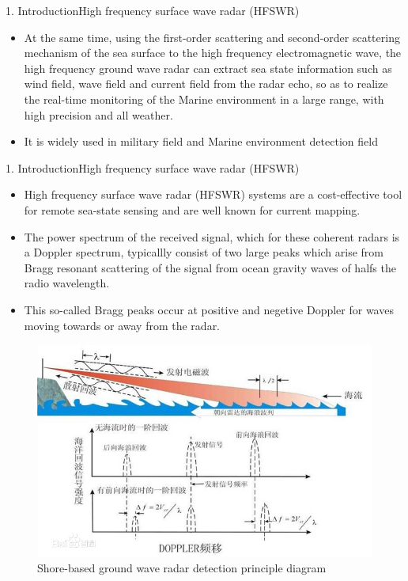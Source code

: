 \documentclass[12pt]{beamer}
\begin{document}
\begin{frame}{1. Introduction}{High frequency surface wave radar (HFSWR)}
  \begin{itemize}
    \item At the same time, using the first-order scattering and second-order scattering mechanism of the sea surface to the high frequency electromagnetic wave, the high frequency ground wave radar can extract sea state information such as wind field, wave field and current field from the radar echo, so as to realize the real-time monitoring of the Marine environment in a large range, with high precision and all weather.
    \item It is widely used in military field and Marine environment detection field
  \end{itemize}
\end{frame}


\begin{frame}{1. Introduction}{High frequency surface wave radar (HFSWR)}
  \begin{itemize}
    \item High frequency surface wave radar (HFSWR) systems are a cost-effective tool for remote sea-state sensing and are well known for current mapping.
    \item The power spectrum of the received signal, which for these coherent radars is a Doppler spectrum, typicallly consist of two large peaks which arise from Bragg resonant scattering of the signal from ocean gravity waves of halfs the radio wavelength.
    \item This so-called Bragg peaks occur at positive and negetive Doppler for waves moving towards or away from the radar.
  \end{itemize}
\end{frame}
\begin{frame}
  \begin{figure}[htbp]
    \centering
    \includegraphics[width=0.7\linewidth]{figs/f7.jpg}
    \caption{Shore-based ground wave radar detection principle diagram}
  \end{figure}  
\end{frame}
\end{document}
